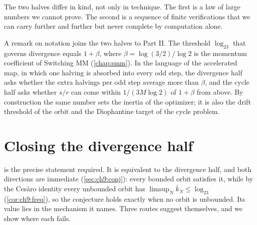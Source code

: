 The two halves differ in kind, not only in technique. The first is a law of
large numbers we cannot prove. The second is a sequence of finite verifications that we can
carry further and further but never complete by computation alone.

A remark on notation joins the two halves to Part II. The threshold
$\log_23$ that governs divergence equals $1+\beta$, where
$\beta=\log(3/2)/\log2$ is the momentum coefficient of Switching MM
(\cref{chap:smm}). In the language of the accelerated map, in which one halving
is absorbed into every odd step, the divergence half asks whether the extra
halvings per odd step average more than $\beta$, and the cycle half asks
whether $s/r$ can come within $1/(3M\log 2)$ of $1+\beta$ from above.
By construction the same number sets the inertia of the optimizer; it is also the drift threshold of the orbit and the Diophantine target of the cycle problem.

\section{Closing the divergence half}\label{sec:ch10:divergence}

 is the precise statement required.
It is equivalent to the divergence half, and both directions are immediate (\cref{sec:ch9:conj}): every bounded orbit satisfies it, while by the Ces\`aro identity every unbounded orbit has $\limsup_N\bar k_N\le\log_23$ (\cref{cor:ch9:freq}), so the conjecture holds exactly when no orbit is unbounded.
Its value lies in the mechanism it names.
Three routes suggest themselves, and we show where each fails.

